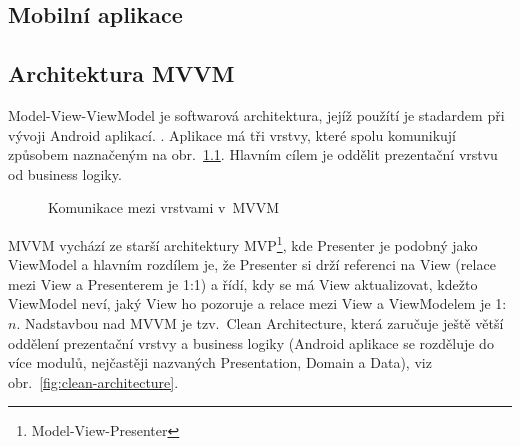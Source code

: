 \documentclass[twoside]{ctuthesis}
\begin{document}
\begin{enumerate}[label=\textbf{O\arabic*.}]

%
\chapter{Mobilní aplikace}
%
\section{Architektura MVVM}

Model-View-ViewModel je softwarová architektura, jejíž použítí je sta\-dar\-dem při vývoji Android aplikací. \cite{android2020guide}. Aplikace má tři vrstvy, které spolu komunikují způsobem naznačeným na obr.~\ref{fig:mvvm}. Hlavním cílem je oddělit prezentační vrstvu od business logiky.  \cite{shekhar2020mvvm}

\begin{figure}[h!]
	
	\caption{Komunikace mezi vrstvami v~MVVM}
	\label{fig:mvvm}
\end{figure}

MVVM vychází ze starší architektury MVP\footnote{Model-View-Presenter}, kde Presenter je podobný jako ViewModel a hlavním rozdílem je, že Presenter si drží referenci na View (relace mezi View a Presenterem je 1:1) a řídí, kdy se má View aktualizovat, kdežto ViewModel neví, jaký View ho pozoruje a relace mezi View a ViewModelem je 1:$n$. \cite{vogel2017android} Nadstavbou nad MVVM je tzv.~Clean Architecture, která zaručuje ještě větší oddělení prezentační vrstvy a business logiky (Android aplikace se rozděluje do více modulů, nejčastěji nazvaných Presentation, Domain a Data), viz obr.~\ref{fig:clean-architecture}. \cite{jain2019kotlin}


\end{enumerate}
\end{document}
